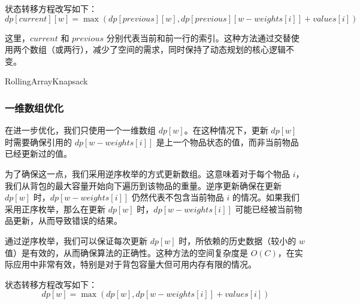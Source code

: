\documentclass[UTF8,titlepage]{ctexart}
\numberwithin{figure}{section}
\begin{document}
状态转移方程改写如下：
\begin{equation}
    dp[current][w] = \max(dp[previous][w], dp[previous][w-weights[i]] + values[i])
\end{equation}

这里，$current$ 和 $previous$ 分别代表当前和前一行的索引。这种方法通过交替使用两个数组（或两行），减少了空间的需求，同时保持了动态规划的核心逻辑不变。

\begin{algorithm}[H]
    \SetAlgoLined
    \DontPrintSemicolon
    \caption{RollingArrayKnapsack}
    \end{algorithm}

\subsubsection{一维数组优化}
在进一步优化，我们只使用一个一维数组 $dp[w]$。在这种情况下，更新 $dp[w]$ 时需要确保引用的 $dp[w-weights[i]]$ 是上一个物品状态的值，而非当前物品已经更新过的值。

为了确保这一点，我们采用逆序枚举的方式更新数组。这意味着对于每个物品 $i$，我们从背包的最大容量开始向下遍历到该物品的重量。逆序更新确保在更新 $dp[w]$ 时，$dp[w-weights[i]]$ 仍然代表不包含当前物品 $i$ 的情况。如果我们采用正序枚举，那么在更新 $dp[w]$ 时，$dp[w-weights[i]]$ 可能已经被当前物品更新，从而导致错误的结果。

通过逆序枚举，我们可以保证每次更新 $dp[w]$ 时，所依赖的历史数据（较小的 $w$ 值）是有效的，从而确保算法的正确性。这种方法的空间复杂度是 \(O(C)\)，在实际应用中非常有效，特别是对于背包容量大但可用内存有限的情况。

状态转移方程改写如下：
\begin{equation}
    dp[w] = \max(dp[w], dp[w-weights[i]] + values[i])
\end{equation}
\end{document}
